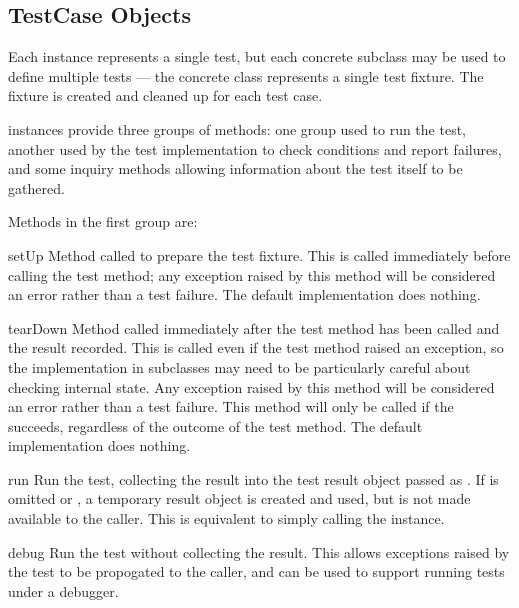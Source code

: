 \subsection{TestCase Objects
            \label{testcase-objects}}

Each  instance represents a single test, but each
concrete subclass may be used to define multiple tests --- the
concrete class represents a single test fixture.  The fixture is
created and cleaned up for each test case.

 instances provide three groups of methods: one group
used to run the test, another used by the test implementation to
check conditions and report failures, and some inquiry methods
allowing information about the test itself to be gathered.

Methods in the first group are:

\begin{methoddesc}[TestCase]{setUp}{}
  Method called to prepare the test fixture.  This is called
  immediately before calling the test method; any exception raised by
  this method will be considered an error rather than a test failure.
  The default implementation does nothing.
\end{methoddesc}

\begin{methoddesc}[TestCase]{tearDown}{}
  Method called immediately after the test method has been called and
  the result recorded.  This is called even if the test method raised
  an exception, so the implementation in subclasses may need to be
  particularly careful about checking internal state.  Any exception
  raised by this method will be considered an error rather than a test
  failure.  This method will only be called if the 
  succeeds, regardless of the outcome of the test method.
  The default implementation does nothing.  
\end{methoddesc}

\begin{methoddesc}[TestCase]{run}{}
  Run the test, collecting the result into the test result object
  passed as .  If  is omitted or ,
  a temporary result object is created and used, but is not made
  available to the caller.  This is equivalent to simply calling the
   instance.
\end{methoddesc}

\begin{methoddesc}[TestCase]{debug}{}
  Run the test without collecting the result.  This allows exceptions
  raised by the test to be propogated to the caller, and can be used
  to support running tests under a debugger.
\end{methoddesc}


